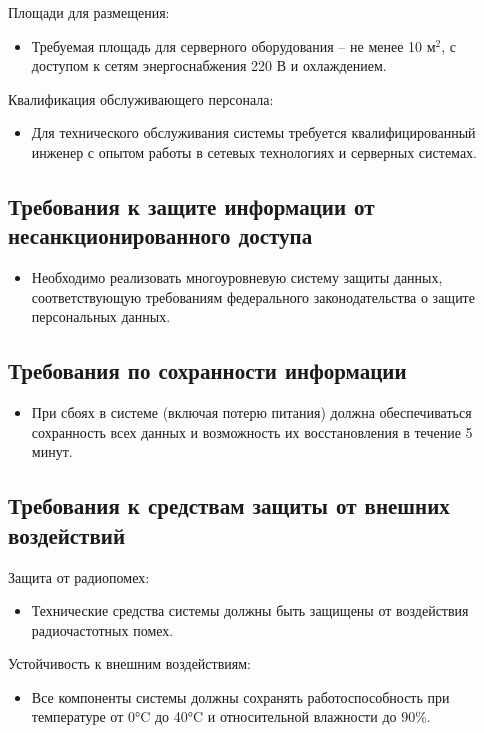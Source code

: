 \noindent Площади для размещения:
\begin{itemize}
    \item Требуемая площадь для серверного оборудования -- не менее 10
    $\text{м}^2$, с доступом к сетям энергоснабжения 220 В и охлаждением.
\end{itemize}

\noindent Квалификация обслуживающего персонала:
\begin{itemize}
    \item Для технического обслуживания системы требуется квалифицированный
    инженер с опытом работы в сетевых технологиях и серверных системах.
\end{itemize}

\subsection{Требования к защите информации от несанкционированного доступа}
\begin{itemize}
    \item Необходимо реализовать многоуровневую систему защиты данных,
    соответствующую требованиям федерального законодательства о защите
    персональных данных.
\end{itemize}

\subsection{Требования по сохранности информации}
\begin{itemize}
    \item При сбоях в системе (включая потерю питания) должна обеспечиваться
    сохранность всех данных и возможность их восстановления в течение 5 минут.
\end{itemize}

\subsection{Требования к средствам защиты от внешних воздействий}

\noindent Защита от радиопомех:
\begin{itemize}
    \item Технические средства системы должны быть защищены от воздействия
    радиочастотных помех.
\end{itemize}

\noindent Устойчивость к внешним воздействиям:
\begin{itemize}
    \item Все компоненты системы должны сохранять работоспособность при
    температуре от 0°C до 40°C и относительной влажности до 90\%.
\end{itemize}

